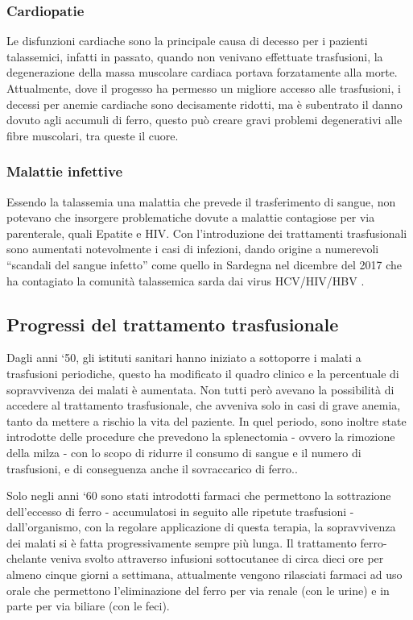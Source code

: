 \documentclass[12pt,a4paper,openright,twoside]{report}
\begin{document}
\subsubsection{Cardiopatie}
Le disfunzioni cardiache sono la principale causa di decesso per i pazienti talassemici, infatti in passato, quando non venivano effettuate trasfusioni, la degenerazione della massa muscolare cardiaca portava forzatamente alla morte. Attualmente, dove il progesso ha permesso un migliore accesso alle trasfusioni, i decessi per anemie cardiache sono decisamente ridotti, ma è subentrato il danno dovuto agli accumuli di ferro, questo può creare gravi problemi degenerativi alle fibre muscolari, tra queste il cuore.

\subsubsection{Malattie infettive}
Essendo la talassemia una malattia che prevede il trasferimento di sangue, non potevano che insorgere problematiche dovute a malattie contagiose per via parenterale, quali Epatite e HIV.
Con l'introduzione dei trattamenti trasfusionali sono aumentati notevolmente i casi di infezioni, dando origine a numerevoli ``scandali del sangue infetto'' come quello in Sardegna nel dicembre del 2017 che ha contagiato la comunità talassemica sarda dai virus HCV/HIV/HBV \cite{giunti2019etnografia}.


\subsection{Progressi del trattamento trasfusionale}
Dagli anni `50, gli istituti sanitari hanno iniziato a sottoporre i malati a trasfusioni periodiche, questo ha modificato il quadro clinico e la percentuale di sopravvivenza dei malati è aumentata. Non tutti però avevano la possibilità di accedere al trattamento trasfusionale, che avveniva solo in casi di grave anemia, tanto da mettere a rischio la vita del paziente. In quel periodo, sono inoltre state introdotte delle procedure che prevedono la splenectomia - ovvero la rimozione della milza - con lo scopo di ridurre il consumo di sangue e il numero di trasfusioni, e di conseguenza anche il sovraccarico di ferro.\cite{casale2013effect}.

Solo negli anni `60 sono stati introdotti farmaci che permettono la sottrazione dell'eccesso di ferro - accumulatosi in seguito alle ripetute trasfusioni - dall'organismo, con la regolare applicazione di questa terapia, la sopravvivenza dei malati si è fatta progressivamente sempre più lunga\cite{atzeni2002beta}.
Il trattamento ferro-chelante veniva svolto attraverso infusioni sottocutanee di circa dieci ore per almeno cinque giorni a settimana, attualmente vengono rilasciati farmaci ad uso orale che permettono l'eliminazione del ferro per via renale (con le urine) e in parte per via biliare (con le feci).
\end{document}
